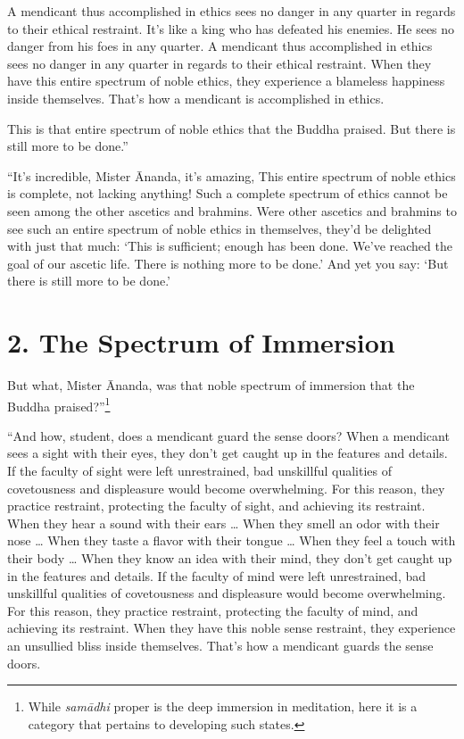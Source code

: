 \documentclass[12pt,openany]{book}%
\begin{document}
A mendicant thus accomplished in ethics sees no danger in any quarter in regards to their ethical restraint. It’s like a king who has defeated his enemies. He sees no danger from his foes in any quarter. A mendicant thus accomplished in ethics sees no danger in any quarter in regards to their ethical restraint. When they have this entire spectrum of noble ethics, they experience a blameless happiness inside themselves. That’s how a mendicant is accomplished in ethics. 

This is that entire spectrum of noble ethics that the Buddha praised. But there is still more to be done.” 

“It’s incredible, Mister Ānanda, it’s amazing, This entire spectrum of noble ethics is complete, not lacking anything! Such a complete spectrum of ethics cannot be seen among the other ascetics and brahmins. Were other ascetics and brahmins to see such an entire spectrum of noble ethics in themselves, they’d be delighted with just that much: ‘This is sufficient; enough has been done. We’ve reached the goal of our ascetic life. There is nothing more to be done.’ And yet you say: ‘But there is still more to be done.’ 

\section*{2. The Spectrum of Immersion }

But what, Mister Ānanda, was that noble spectrum of immersion that the Buddha praised?”\footnote{While \textit{\textsanskrit{samādhi}} proper is the deep immersion in meditation, here it is a category that pertains to developing such states. } 

“And how, student, does a mendicant guard the sense doors? When a mendicant sees a sight with their eyes, they don’t get caught up in the features and details. If the faculty of sight were left unrestrained, bad unskillful qualities of covetousness and displeasure would become overwhelming. For this reason, they practice restraint, protecting the faculty of sight, and achieving its restraint. When they hear a sound with their ears … When they smell an odor with their nose … When they taste a flavor with their tongue … When they feel a touch with their body … When they know an idea with their mind, they don’t get caught up in the features and details. If the faculty of mind were left unrestrained, bad unskillful qualities of covetousness and displeasure would become overwhelming. For this reason, they practice restraint, protecting the faculty of mind, and achieving its restraint. When they have this noble sense restraint, they experience an unsullied bliss inside themselves. That’s how a mendicant guards the sense doors. 
\end{document}
